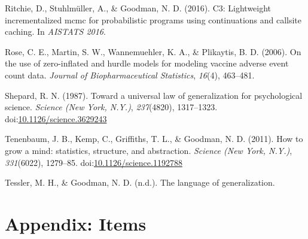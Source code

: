 \documentclass[,man,floatsintext]{apa6}
\theoremstyle{definition}
\theoremstyle{definition}
\theoremstyle{definition}
\theoremstyle{remark}
\begin{document}
\leavevmode\hypertarget{ref-Ritchie2016}{}%
Ritchie, D., Stuhlmüller, A., \& Goodman, N. D. (2016). C3: Lightweight
incrementalized mcmc for probabilistic programs using continuations and
callsite caching. In \emph{AISTATS 2016}.

\leavevmode\hypertarget{ref-hurdleModels}{}%
Rose, C. E., Martin, S. W., Wannemuehler, K. A., \& Plikaytis, B. D.
(2006). On the use of zero-inflated and hurdle models for modeling
vaccine adverse event count data. \emph{Journal of Biopharmaceutical
Statistics}, \emph{16}(4), 463--481.

\leavevmode\hypertarget{ref-Shepard1987}{}%
Shepard, R. N. (1987). Toward a universal law of generalization for
psychological science. \emph{Science (New York, N.Y.)},
\emph{237}(4820), 1317--1323.
doi:\href{https://doi.org/10.1126/science.3629243}{10.1126/science.3629243}

\leavevmode\hypertarget{ref-Tenenbaum2011}{}%
Tenenbaum, J. B., Kemp, C., Griffiths, T. L., \& Goodman, N. D. (2011).
How to grow a mind: statistics, structure, and abstraction.
\emph{Science (New York, N.Y.)}, \emph{331}(6022), 1279--85.
doi:\href{https://doi.org/10.1126/science.1192788}{10.1126/science.1192788}

\leavevmode\hypertarget{ref-TesslerLangGenUnderReview}{}%
Tessler, M. H., \& Goodman, N. D. (n.d.). The language of
generalization.

\newpage

\hypertarget{appendix-items}{%
\section{Appendix: Items}\label{appendix-items}}
\end{document}
